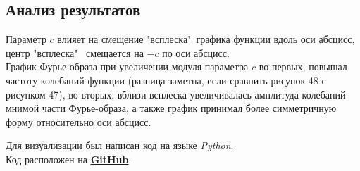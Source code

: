 \documentclass[a5paper, 10pt]{article}
\theoremstyle{definition}
\theoremstyle{plain}
\theoremstyle{remark}
\begin{document}
\newpage
\subsection{Анализ результатов}

Параметр $c$ влияет на смещение "всплеска"\, графика функции вдоль оси абсцисс, центр "всплеска" \, смещается на $-c$ по оси абсцисс.\\

График Фурье-образа при увеличении модуля параметра $c$ во-первых, повышал частоту колебаний функции (разница заметна, если сравнить рисунок 48 с рисунком 47), во-вторых, вблизи всплеска увеличивалась амплитуда колебаний мнимой части Фурье-образа, а также график принимал более симметричную форму относительно оси абсцисс.



\newpage

Для визуализации был написан код на языке \textit{Python}. \\
Код расположен на \href{https://github.com/a-nechaeva/practical_Linal/tree/main/lab4}{\textbf{GitHub}}.
\end{document}
